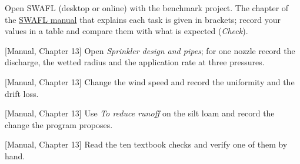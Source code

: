 {\small Open SWAFL (desktop or online) with the benchmark project. The chapter of the \href{https://github.com/halilunaziru73-creator/Coupled-Water-Fluxes-Pore-Scale-Dynamics-Precision-Irrigation-Mulching-Feedback-Loops/raw/main/Software/v1.1.0/SWAFL_Desktop/docs/manual_v1.1.0/SWAFL_Manual_v1.1.0.pdf}{SWAFL manual} that explains each task is given in brackets; record your values in a table and compare them with what is expected (\emph{Check}).}\par\vspace{3pt}
\begin{exlist}
\item {\color{khblue}[Manual, Chapter 13]} Open \emph{Sprinkler design and pipes}; for one nozzle record the discharge, the wetted radius and the application rate at three pressures.\par{}
\item {\color{khblue}[Manual, Chapter 13]} Change the wind speed and record the uniformity and the drift loss.\par{}
\item {\color{khblue}[Manual, Chapter 13]} Use \emph{To reduce runoff} on the silt loam and record the change the program proposes.\par{}
\item {\color{khblue}[Manual, Chapter 13]} Read the ten textbook checks and verify one of them by hand.\par{}
\end{exlist}
